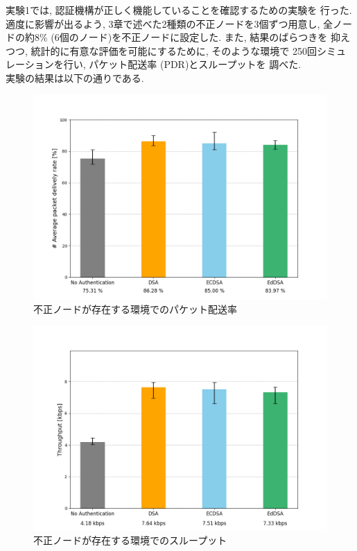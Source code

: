 実験1では, 認証機構が正しく機能していることを確認するための実験を
行った. 適度に影響が出るよう, 3章で述べた2種類の不正ノードを3個ずつ用意し, 
全ノードの約8\% (6個のノード)を不正ノードに設定した. また, 結果のばらつきを
抑えつつ, 統計的に有意な評価を可能にするために, そのような環境で
250回シミュレーションを行い, パケット配送率 (PDR)とスループットを
調べた. \\
\indent 実験の結果は以下の通りである. \\

\newpage
\begin{figure}
  \centering
  \includegraphics[width=1\textwidth]{figures/exp1_pdr.png}
  \caption{不正ノードが存在する環境でのパケット配送率}
  \label{fig:exp1_pdr}
\end{figure}
\clearpage
\begin{figure}
  \centering
  \includegraphics[width=1\textwidth]{figures/exp1_throughput.png}
  \caption{不正ノードが存在する環境でのスループット}
  \label{fig:exp1_throughput}
\end{figure}


